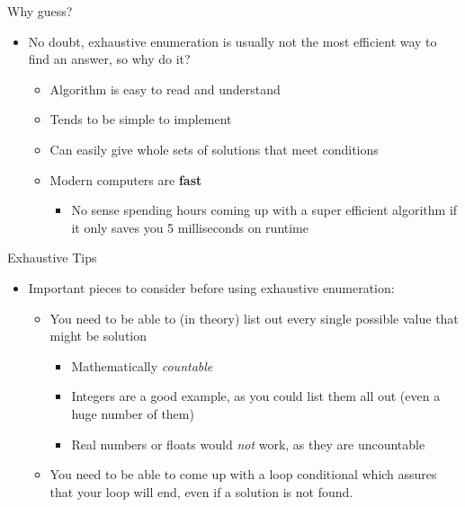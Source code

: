 \documentclass[pdf, aspectratio=169, 12pt]{beamer}
\begin{document}
\begin{frame}{Why guess?}
	\begin{itemize}
		\item No doubt, exhaustive enumeration is usually not the most efficient way to find an answer, so why do it?
			\begin{itemize}
				\item Algorithm is easy to read and understand
				\item Tends to be simple to implement
				\item Can easily give whole sets of solutions that meet conditions
				\item Modern computers are \textbf{fast}
					\begin{itemize}
						\item No sense spending hours coming up with a super efficient algorithm if it only saves you 5 milliseconds on runtime
					\end{itemize}
					
			\end{itemize}
			
	\end{itemize}
	
\end{frame}


\begin{frame}{Exhaustive Tips}
	\begin{itemize}
		\item Important pieces to consider before using exhaustive enumeration:
			\begin{itemize}
				\item You need to be able to (in theory) list out every single possible value that might be solution
					\begin{itemize}
						\item Mathematically \emph{countable}
						\item Integers are a good example, as you could list them all out (even a huge number of them)
						\item Real numbers or floats would \emph{not} work, as they are uncountable
					\end{itemize}
				\item You need to be able to come up with a loop conditional which assures that your loop will end, even if a solution is not found.
					
			\end{itemize}
	\end{itemize}
\end{frame}
\end{document}
